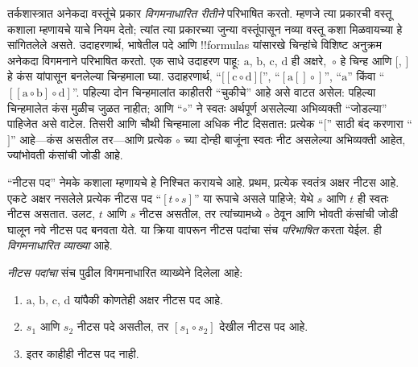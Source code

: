 \documentclass[../../../include/open-logic-section]{subfiles}
\begin{document}


तर्कशास्त्रात अनेकदा वस्तूंचे प्रकार \emph{विगमनाधारित रीतीने} परिभाषित करतो. म्हणजे त्या प्रकारची वस्तू कशाला म्हणायचे याचे नियम देतो; त्यांत त्या प्रकारच्या जुन्या वस्तूंपासून नव्या वस्तू कशा मिळवायच्या हे सांगितलेले असते. उदाहरणार्थ, भाषेतील पदे आणि !!{formula}s यांसारखे चिन्हांचे विशिष्ट अनुक्रम अनेकदा विगमनाने परिभाषित करतो. एक साधे उदाहरण पाहू: $\mathrm{a}$, $\mathrm{b}$, $\mathrm{c}$, $\mathrm{d}$ ही अक्षरे,~$\circ$ हे चिन्ह आणि $[$, $]$ हे कंस यांपासून बनलेल्या चिन्हमाला घ्या. उदाहरणार्थ, “$[[\mathrm{c} \circ \mathrm{d}][$”, “$[\mathrm{a}[]\circ]$”, “$\mathrm{a}$” किंवा “$[[\mathrm{a} \circ \mathrm{b}]\circ \mathrm{d}]$”. पहिल्या दोन चिन्हमालांत काहीतरी “चुकीचे” आहे असे वाटत असेल: पहिल्या चिन्हमालेत कंस मुळीच जुळत नाहीत; आणि “$\circ$” ने स्वतः अर्थपूर्ण असलेल्या अभिव्यक्ती “जोडल्या” पाहिजेत असे वाटेल. तिसरी आणि चौथी चिन्हमाला अधिक नीट दिसतात: प्रत्येक “$[$” साठी बंद करणारा “$]$” आहे---कंस असतील तर---आणि प्रत्येक $\circ$ च्या दोन्ही बाजूंना स्वतः नीट असलेल्या अभिव्यक्ती आहेत, ज्यांभोवती कंसांची जोडी आहे.

“नीटस पद” नेमके कशाला म्हणायचे हे निश्चित करायचे आहे. प्रथम, प्रत्येक स्वतंत्र अक्षर नीटस आहे. एकटे अक्षर नसलेले प्रत्येक नीटस पद “$[t \circ s]$” या रूपाचे असले पाहिजे; येथे $s$ आणि $t$ ही स्वतः नीटस असतात. उलट, $t$ आणि $s$ नीटस असतील, तर त्यांच्यामध्ये $\circ$ ठेवून आणि भोवती कंसांची जोडी घालून नवे नीटस पद बनवता येते. या क्रिया वापरून नीटस पदांचा संच \emph{परिभाषित} करता येईल. ही \emph{विगमनाधारित व्याख्या} आहे.

\begin{defn}[नीटस पदे]
\emph{नीटस पदांचा} संच पुढील विगमनाधारित व्याख्येने दिलेला आहे:
\begin{enumerate}
\item $\mathrm{a}$, $\mathrm{b}$, $\mathrm{c}$, $\mathrm{d}$ यांपैकी कोणतेही अक्षर नीटस पद आहे.
\item $s_1$ आणि $s_2$ नीटस पदे असतील, तर $[s_1 \circ s_2]$ देखील नीटस पद आहे.
\item इतर काहीही नीटस पद नाही.
\end{enumerate}
\end{defn}
\end{document}
